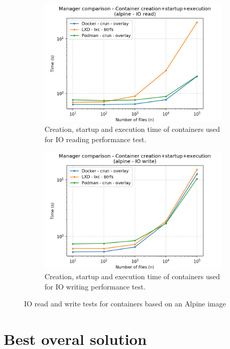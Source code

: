 \begin{figure}[h!]
    \begin{subfigure}{.5\textwidth}
      \centering
      \includegraphics[width=\linewidth]{images/manager/manager-full-alpine---IO-read.png}
      \caption{Creation, startup and execution time of containers used for IO reading performance test.}
      \label{fig:manager:io-read-full}
    \end{subfigure}
    \begin{subfigure}{.5\textwidth}
      \centering
      \includegraphics[width=\linewidth]{images/manager/manager-full-alpine---IO-write.png}
      \caption{Creation, startup and execution time of containers used for IO writing performance test.}
      \label{fig:manager:io-write-full}
    \end{subfigure}
    
    \caption{IO read and write tests for containers based on an Alpine image}
    \label{fig:manager:db}
\end{figure}

\clearpage
\section{Best overal solution}
